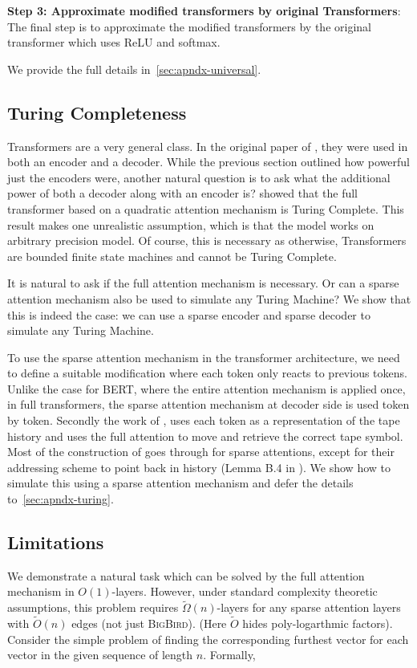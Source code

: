 \textbf{Step 3: Approximate modified transformers by original Transformers}: The final step is to approximate the modified transformers by the original transformer which uses ReLU and softmax. 

We provide the full details in~\ref{sec:apndx-universal}.

\subsection{Turing Completeness} Transformers are a very general class. In the original paper of \citet{vaswani2017attention}, they were used in both an encoder and a decoder. While the previous section outlined how powerful just the encoders were,  another natural question is to ask what the additional power of both a decoder along with an encoder is? \citet{Perez19} showed that the full  transformer based on a quadratic attention mechanism is Turing Complete. This result makes one  unrealistic assumption, which is that the model works on arbitrary precision model. Of course,  this is necessary as otherwise, Transformers are bounded finite state machines and cannot be Turing Complete. 

It is natural to ask if the full attention mechanism is necessary. Or can a sparse attention mechanism also be used to simulate any Turing Machine? We show that this is indeed the case: we can use a sparse encoder and sparse decoder to simulate any Turing Machine. 

To use the sparse attention mechanism in the transformer architecture, we need to define a suitable modification where each token only reacts to previous tokens. Unlike the case for BERT, where the entire attention mechanism is applied once, in  full transformers, the sparse attention mechanism at decoder side is used token by token. Secondly the work of \citet{Perez19}, uses each token as a representation of the tape history and  uses the full attention to move and retrieve the correct tape symbol. Most of the construction of \citet{Perez19} goes through for sparse attentions, except for their addressing scheme to point back in history (Lemma B.4 in \citep{Perez19}). We show how to simulate this using a sparse attention mechanism and defer the details to~\ref{sec:apndx-turing}.

\subsection{Limitations}
\label{sec:limit}
We demonstrate a natural task which can be solved by the full attention mechanism in $O(1)$-layers. However, under standard complexity theoretic assumptions, this problem requires 
$\tilde{\Omega}(n)$-layers for any sparse attention layers with $\tilde{O}(n)$ edges (not just \textsc{BigBird}). (Here $\tilde{O}$ hides poly-logarthmic  factors). Consider the simple problem of finding the corresponding furthest vector for each vector in the given sequence of length $n$. Formally,

